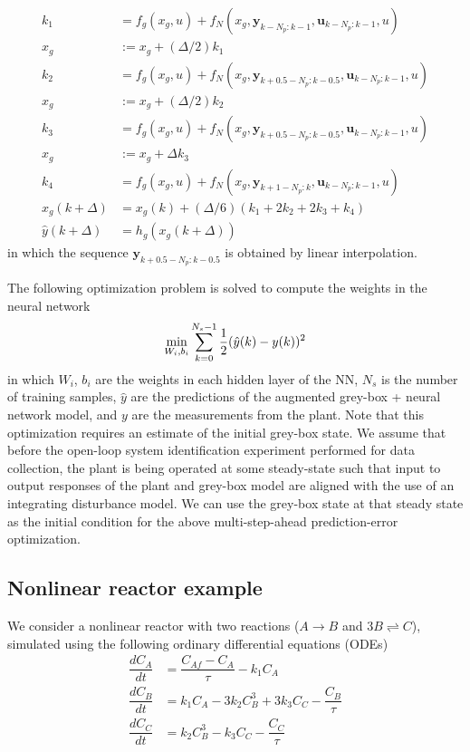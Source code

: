 \documentclass{article}
\begin{document}
\begin{align*}
  k_1 &= f_g(x_g, u) + 
  f_N(x_g, \mathbf{y}_{k-N_p:k-1}, \mathbf{u}_{k-N_p:k-1}, u) \\
  x_g & := x_g + (\Delta/2)k_1 \\
  k_2 &= f_g(x_g, u) + 
  f_N(x_g, \mathbf{y}_{k+0.5-N_p:k-0.5}, \mathbf{u}_{k-N_p:k-1}, u)\\
  x_g & := x_g + (\Delta/2)k_2 \\
  k_3 &= f_g(x_g, u) + 
  f_N(x_g, \mathbf{y}_{k+0.5-N_p:k-0.5}, \mathbf{u}_{k-N_p:k-1}, u)\\
  x_g & := x_g + \Delta k_3 \\
  k_4 &= f_g(x_g, u) + 
  f_N(x_g, \mathbf{y}_{k+1-N_p:k}, \mathbf{u}_{k-N_p:k-1}, u)\\
  x_g(k+\Delta) &= x_g(k) + (\Delta/6)(k_1 + 2k_2 + 2k_3 + k_4) \\
  \hat{y}(k+\Delta) &= h_g(x_g(k+\Delta)) 
\end{align*}
in which the sequence $\mathbf{y}_{k+0.5-N_p:k-0.5}$ is obtained by linear
interpolation.

The following optimization problem is solved to compute the weights in the
neural network
\begin{align*}
\underset{W_i, b_i}{\textnormal{min}} \sum_{k=0}^{N_s-1} 
\dfrac{1}{2}(\hat{y}(k) - y(k))^2
 \end{align*}
in which $W_i$, $b_i$ are the weights in each hidden layer of the NN, $N_s$ is
the number of training samples, $\hat{y}$ are the predictions of the augmented
grey-box + neural network model, and $y$ are the measurements from the plant.
Note that this optimization requires an estimate of the initial grey-box state.
We assume that before the open-loop system identification experiment performed
for data collection, the plant is being operated at some steady-state such that
input to output responses of the plant and grey-box model are aligned with the
use of an integrating disturbance model. We can use the grey-box state at that
steady state as the initial condition for the above multi-step-ahead
prediction-error optimization.

\subsection{Nonlinear reactor example}
We consider a nonlinear reactor with two reactions ($A \rightarrow B $ and  $3B
\rightleftharpoons C$), simulated using the following ordinary differential
equations (ODEs)
\begin{align*}
  \dfrac{dC_A}{dt} &= \dfrac{C_{Af} - C_A}{\tau} - k_1C_A\\
  \dfrac{dC_B}{dt} &= k_1C_A - 3k_2C^3_B + 3k_3C_C- \dfrac{C_B}{\tau}\\
  \dfrac{dC_C}{dt} &= k_2C^3_B - k_3C_C - \dfrac{C_C}{\tau}
\end{align*}
\end{document}
